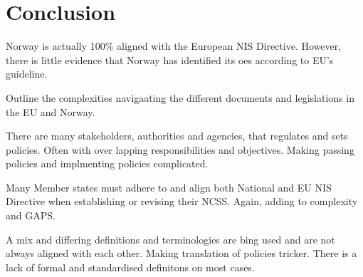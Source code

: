 \section{Conclusion}

Norway is actually 100\% aligned with the European NIS Directive. However, there is little evidence that Norway has identified its \acrshort{oes} according to EU's guideline.

\begin{followup}
  Outline the complexities navigaating the different documents and legislations in the EU and Norway.

  There are many stakeholders, authorities and agencies, that regulates and sets policies. Often with over lapping responsibilities and objectives. Making passing policies and implmenting policies complicated.
  
  Many Member states must adhere to and align both National and EU NIS Directive when establishing or revising their NCSS. Again, adding to complexity and GAPS.

  A mix and differing definitions and terminologies are bing used and are not always aligned with each other. Making translation of policies tricker. There is a lack of formal and standardised definitons on most cases.
\end{followup}


% 


